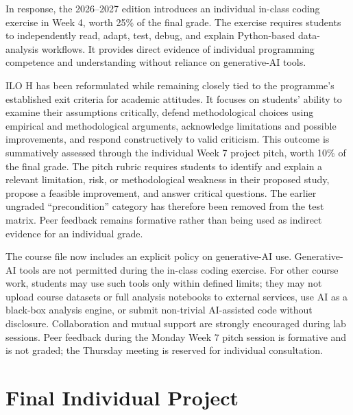 \documentclass[a4paper,12pt]{report}
\begin{document}
In response, the 2026--2027 edition introduces an individual in-class coding exercise in Week 4, worth 25\% of the final grade. The exercise requires students to independently read, adapt, test, debug, and explain Python-based data-analysis workflows. It provides direct evidence of individual programming competence and understanding without reliance on generative-AI tools.

ILO H has been reformulated while remaining closely tied to the programme's established exit criteria for academic attitudes. It focuses on students' ability to examine their assumptions critically, defend methodological choices using empirical and methodological arguments, acknowledge limitations and possible improvements, and respond constructively to valid criticism. This outcome is summatively assessed through the individual Week 7 project pitch, worth 10\% of the final grade. The pitch rubric requires students to identify and explain a relevant limitation, risk, or methodological weakness in their proposed study, propose a feasible improvement, and answer critical questions. The earlier ungraded ``precondition'' category has therefore been removed from the test matrix. Peer feedback remains formative rather than being used as indirect evidence for an individual grade.

The course file now includes an explicit policy on generative-AI use. Generative-AI tools are not permitted during the in-class coding exercise. For other course work, students may use such tools only within defined limits; they may not upload course datasets or full analysis notebooks to external services, use AI as a black-box analysis engine, or submit non-trivial AI-assisted code without disclosure. Collaboration and mutual support are strongly encouraged during lab sessions. Peer feedback during the Monday Week 7 pitch session is formative and is not graded; the Thursday meeting is reserved for individual consultation.

\appendix
\chapter{Final Individual Project}
\newcommand{\finalprojectheading}{}




\end{document}
